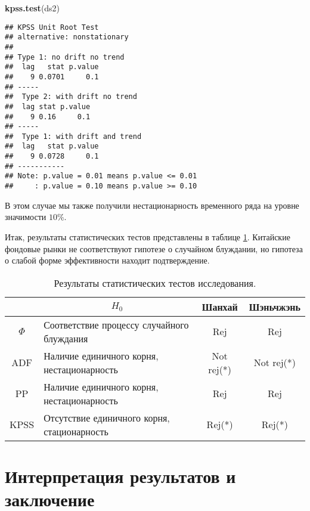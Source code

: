 \documentclass[a4paper,12pt]{article}
\newenvironment{Shaded}{\begin{snugshade}}{\end{snugshade}}
\newcommand{\KeywordTok}[1]{\textcolor[rgb]{0.13,0.29,0.53}{\textbf{#1}}}
\newcommand{\NormalTok}[1]{#1}
\begin{document}
\begin{Shaded}
\begin{Highlighting}[]
\KeywordTok{kpss.test}\NormalTok{(ds2)}
\end{Highlighting}
\end{Shaded}

\begin{multicols}{2}
  \begin{Verbatim}[fontsize=\small]
## KPSS Unit Root Test
## alternative: nonstationary
##
## Type 1: no drift no trend
##  lag   stat p.value
##    9 0.0701     0.1
## -----
##  Type 2: with drift no trend
##  lag stat p.value
##    9 0.16     0.1
## -----
##  Type 1: with drift and trend
##  lag   stat p.value
##    9 0.0728     0.1
## -----------
## Note: p.value = 0.01 means p.value <= 0.01
##     : p.value = 0.10 means p.value >= 0.10
\end{Verbatim}
\end{multicols}

В этом случае мы также получили нестационарность временного ряда на уровне значимости $10\%$.

Итак, результаты статистических тестов представлены в таблице \ref{tab:modres}. Китайские фондовые рынки не соответствуют гипотезе о случайном блуждании, но  гипотеза о слабой форме эффективности находит подтверждение.

\begin{table}
\centering
\caption{Результаты статистических тестов исследования.}
\label{tab:modres}
\begin{tabular}{|c|l|c|c|}
\hline
\multicolumn{1}{|l|}{} & \multicolumn{1}{c|}{$H_0$} & Шанхай & Шэньчжэнь \\ \hline
$\Phi$ & Соответствие процессу случайного блуждания & Rej & Rej \\ \hline
ADF & Наличие единичного корня, нестационарность & Not rej(*) & Not rej(*) \\ \hline
PP & Наличие единичного корня, нестационарность & Rej & Rej \\ \hline
KPSS & Отсутствие единичного корня, стационарность & Rej(*) & Rej(*) \\ \hline
\end{tabular}
\end{table}

\newpage
\section{Интерпретация результатов и заключение}\label{sec:res}
\end{document}

